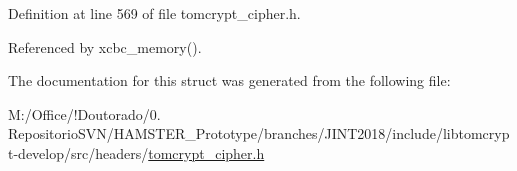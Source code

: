 Definition at line 569 of file tomcrypt\+\_\+cipher.\+h.



Referenced by xcbc\+\_\+memory().



The documentation for this struct was generated from the following file\+:\begin{DoxyCompactItemize}
\item 
M\+:/\+Office/!\+Doutorado/0. Repositorio\+S\+V\+N/\+H\+A\+M\+S\+T\+E\+R\+\_\+\+Prototype/branches/\+J\+I\+N\+T2018/include/libtomcrypt-\/develop/src/headers/\mbox{\hyperlink{tomcrypt__cipher_8h}{tomcrypt\+\_\+cipher.\+h}}\end{DoxyCompactItemize}
